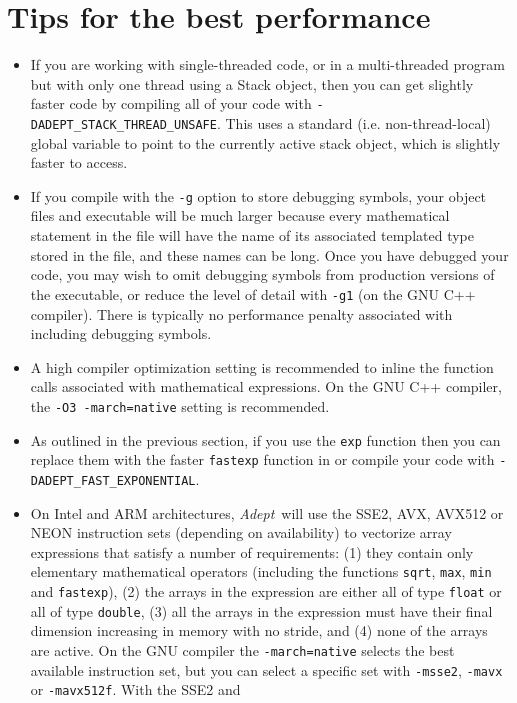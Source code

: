 \documentclass[a4,oneside]{book}
\def\codesize{\small}
\def\Adept{\emph{Adept}}
\def\code#1{{\codesize\texttt{#1}}}
\begin{document}
\section{Tips for the best performance}
\label{sec:tips}
\begin{itemize}
\item If you are working with single-threaded code, or in a
  multi-threaded program but with only one thread using a Stack
  object, then you can get slightly faster code by compiling all of
  your code with \code{-DADEPT\_STACK\_THREAD\_UNSAFE}. This uses a
  standard (i.e. non-thread-local) global variable to point to the
  currently active stack object, which is slightly faster to access.
\item If you compile with the \code{-g} option to store debugging
  symbols, your object files and executable will be much larger
  because every mathematical statement in the file will have the name
  of its associated templated type stored in the file, and these names
  can be long. Once you have debugged your code, you may wish to omit
  debugging symbols from production versions of the executable, or
  reduce the level of detail with \code{-g1} (on the GNU C++
  compiler).  There is typically no performance penalty associated
  with including debugging symbols.
\item A high compiler optimization setting is recommended to inline
  the function calls associated with mathematical expressions.  On the
  GNU C++ compiler, the \code{-O3 -march=native} setting is
  recommended.
\item As outlined in the previous section, if you use the \code{exp}
  function then you can replace them with the faster \code{fastexp}
  function in or compile your code with
  \code{-DADEPT\_FAST\_EXPONENTIAL}.
\item On Intel and ARM architectures, \Adept\ will use the SSE2, AVX,
  AVX512 or NEON instruction sets (depending on availability) to
  vectorize array expressions that satisfy a number of requirements:
  (1) they contain only elementary mathematical operators (including
  the functions \code{sqrt}, \code{max}, \code{min} and
  \code{fastexp}), (2) the arrays in the expression are either all of
  type \code{float} or all of type \code{double}, (3) all the arrays
  in the expression must have their final dimension increasing in
  memory with no stride, and (4) none of the arrays are active. On the
  GNU compiler the \code{-march=native} selects the best available
  instruction set, but you can select a specific set with
  \code{-msse2}, \code{-mavx} or \code{-mavx512f}. With the SSE2 and

\end{itemize}
\end{document}
